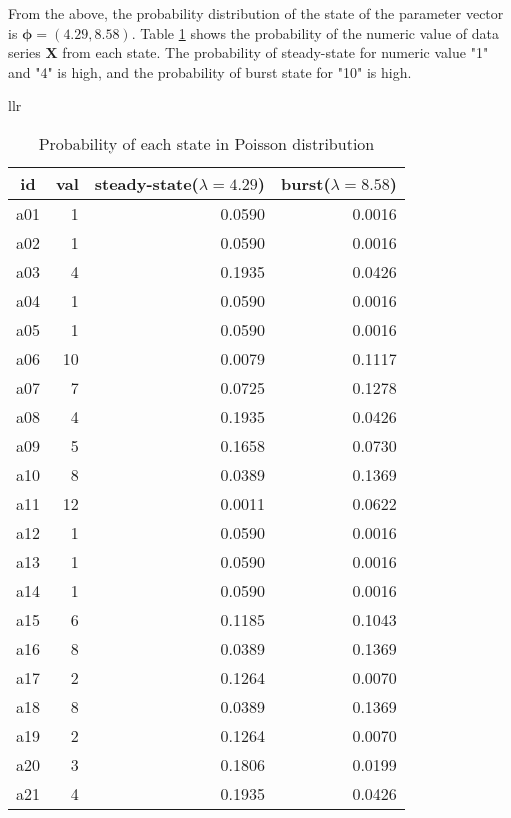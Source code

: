 From the above, the probability distribution of the state of the parameter vector is $\boldsymbol{\phi}=(4.29,8.58)$.
Table \ref{tbl:poiProb} shows the probability of the numeric value of data series $\mathbf{X}$ from each state. 
The probability of steady-state for numeric value "1" and "4" is high, and the probability of burst state for "10" is high.
\begin{table}[htbp]
\begin{center}
\begin{tabular}{llr}

\begin{minipage}{0.45\hsize}
\begin{center}
\caption{Probability of each state in Poisson distribution\label{tbl:poiProb}}
{\small
\begin{tabular}{crrr}
\hline
id&val&steady-state($\lambda=4.29$)&burst($\lambda=8.58$) \\
\hline
a01& 1&0.0590 & 0.0016\\
a02& 1&0.0590 & 0.0016\\
a03& 4&0.1935 & 0.0426\\
a04& 1&0.0590 & 0.0016\\
a05& 1&0.0590 & 0.0016\\
a06&10&0.0079 & 0.1117\\
a07& 7&0.0725 & 0.1278\\
a08& 4&0.1935 & 0.0426\\
a09& 5&0.1658 & 0.0730\\
a10& 8&0.0389 & 0.1369\\
a11&12&0.0011 & 0.0622\\
a12& 1&0.0590 & 0.0016\\
a13& 1&0.0590 & 0.0016\\
a14& 1&0.0590 & 0.0016\\
a15& 6&0.1185 & 0.1043\\
a16& 8&0.0389 & 0.1369\\
a17& 2&0.1264 & 0.0070\\
a18& 8&0.0389 & 0.1369\\
a19& 2&0.1264 & 0.0070\\
a20& 3&0.1806 & 0.0199\\
a21& 4&0.1935 & 0.0426\\
\hline
\end{tabular} 
}
\end{center}
\end{minipage}

\end{tabular} 
\end{center}
\end{table} 

